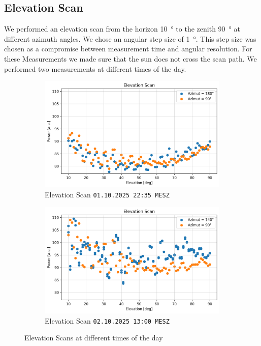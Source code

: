 \subsection{Elevation Scan}
We performed an elevation scan from the horizon \SI{10}{\degree} to the zenith \SI{90}{\degree} at different  azimuth angles.
We chose an angular step size of \SI{1}{\degree}. This step size was chosen as a compromise between measurement time and angular resolution.
For these Measurements we made sure that the sun does not cross the scan path. We performed two measurements at different times of the day.

\begin{figure}[H]
\centering
\begin{subfigure}[t]{0.45\textwidth}
    \centering
    \includegraphics[width=\linewidth]{assets/elev_scan_night.png}
    \caption{Elevation Scan \texttt{01.10.2025 22:35 MESZ}}
\end{subfigure}
\begin{subfigure}[t]{0.45\textwidth}
    \centering
    \includegraphics[width=\linewidth]{assets/elev_scan_day.png}
    \caption{Elevation Scan \texttt{02.10.2025 13:00 MESZ}}
\end{subfigure}
\caption{Elevation Scans at different times of the day}
\label{fig:elev_scan}
\end{figure}

